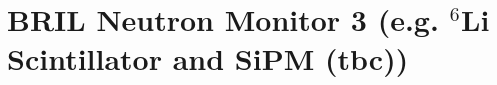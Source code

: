 \chapter{BRIL Neutron Monitor 3 (e.g. \texorpdfstring{$^{6}$Li}{Li-6} Scintillator and SiPM (tbc))}

